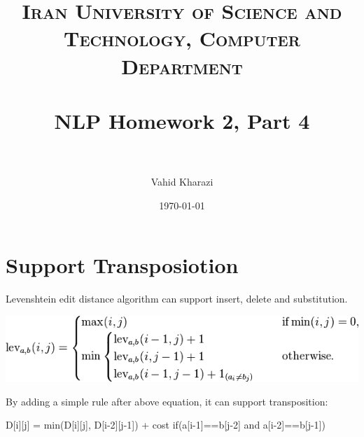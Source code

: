 \documentclass[paper=a4, fontsize=11pt]{scrartcl} %
\title{ 
\normalfont \normalsize 
\textsc{Iran University of Science and Technology, Computer Department} \\ [25pt] %
\horrule{0.5pt} \\[0.4cm] %
\huge NLP Homework 2, Part 4 \\ %
\horrule{2pt} \\[0.5cm] %
}
\author{Vahid Kharazi} %
\date{\normalsize\today} %
\numberwithin{equation}{section} %
\numberwithin{figure}{section} %
\numberwithin{table}{section} %
\begin{document}
\maketitle %


\section{Support Transposiotion}


\begin{flushleft}

Levenshtein edit distance algorithm can support insert, delete and substitution.
\end{flushleft}

\includegraphics[scale=0.5]{lev.png}
\centering


\begin{flushleft}

By adding a simple rule after above equation, it can support transposition:

\end{flushleft}

\begin{spverbatim}
D[i][j] = min(D[i][j], D[i-2][j-1]) + cost  if(a[i-1]==b[j-2] and a[i-2]==b[j-1])

\end{spverbatim}
\end{document}
